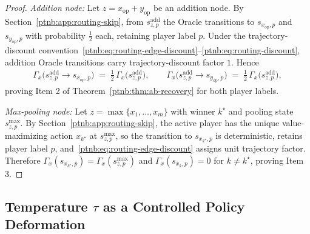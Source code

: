 \begin{proof}
\emph{Addition node:} Let $z = x_{\mathrm{op}} + y_{\mathrm{op}}$ be an addition node. By
Section~\ref{ptnb:app:routing-skip}, from $s^{\mathrm{add}}_{z,p}$ the Oracle transitions to
$s_{x_{\mathrm{op}},p}$ and $s_{y_{\mathrm{op}},p}$ with probability $\tfrac12$ each, retaining
player label $p$. Under the trajectory-discount
convention~\eqref{ptnb:eq:routing-edge-discount}--\eqref{ptnb:eq:routing-discount}, addition Oracle
transitions carry trajectory-discount factor $1$. Hence
\begin{align}
    \Gamma_x\!\bigl(s^{\mathrm{add}}_{z,p}\to s_{x_{\mathrm{op}},p}\bigr) \;=\;
    \tfrac12\,\Gamma_x\!\bigl(s^{\mathrm{add}}_{z,p}\bigr),
    \qquad
    \Gamma_x\!\bigl(s^{\mathrm{add}}_{z,p}\to s_{y_{\mathrm{op}},p}\bigr) \;=\;
    \tfrac12\,\Gamma_x\!\bigl(s^{\mathrm{add}}_{z,p}\bigr),
\end{align}
proving Item 2 of Theorem~\ref{ptnb:thm:ab-recovery} for both player labels.

\emph{Max-pooling node:} Let $z = \max\{x_1,\dots,x_m\}$ with winner $k^\star$ and pooling state
$s_{z,p}^{\max}$. By Section~\ref{ptnb:app:routing-skip}, the active player has the unique
value-maximizing action $x_{k^\star}$ at $s_{z,p}^{\max}$, so the transition to $s_{x_{k^\star},p}$
is deterministic, retains player label $p$, and~\eqref{ptnb:eq:routing-edge-discount} assigns unit
trajectory factor. Therefore $\Gamma_x(s_{x_{k^\star},p}) = \Gamma_x(s_{z,p}^{\max})$ and
$\Gamma_x(s_{x_k,p}) = 0$ for $k \neq k^\star$, proving Item 3.
\end{proof}

\subsection{Temperature \texorpdfstring{$\tau$}{tau} as a Controlled Policy Deformation}\label{ptnb:app:routing-temp}

